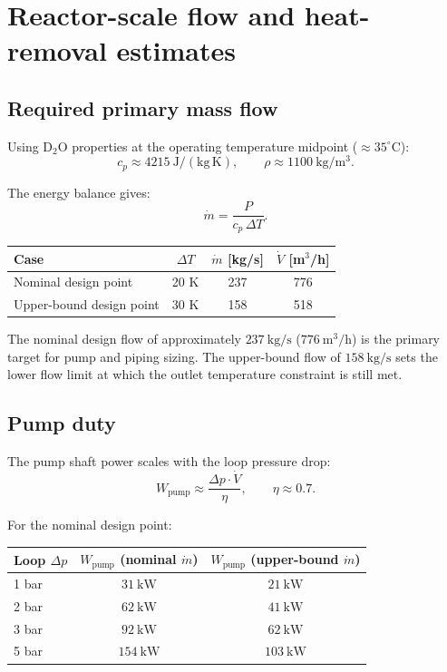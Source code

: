 \documentclass[11pt]{article}
\begin{document}
\section{Reactor-scale flow and heat-removal estimates}

\subsection{Required primary mass flow}

Using D$_2$O properties at the operating temperature midpoint
($\approx 35^{\circ}\mathrm{C}$):
\[
c_p \approx 4215\ \mathrm{J/(kg\,K)},
\qquad
\rho \approx 1100\ \mathrm{kg/m^3}.
\]

The energy balance gives:
\[
\dot{m} = \frac{P}{c_p\,\Delta T}.
\]

\begin{center}
\begin{tabular}{lccc}
\hline
Case & $\Delta T$ & $\dot{m}$ [kg/s] & $\dot{V}$ [m$^3$/h] \\
\hline
Nominal design point & 20 K & 237 & 776 \\
Upper-bound design point & 30 K & 158 & 518 \\
\hline
\end{tabular}
\end{center}

The nominal design flow of approximately $237\ \mathrm{kg/s}$
($776\ \mathrm{m^3/h}$) is the primary target for pump and piping sizing.
The upper-bound flow of $158\ \mathrm{kg/s}$ sets the lower flow limit
at which the outlet temperature constraint is still met.

\subsection{Pump duty}

The pump shaft power scales with the loop pressure drop:
\[
W_{\mathrm{pump}} \approx \frac{\Delta p \cdot \dot{V}}{\eta}, \qquad \eta \approx 0.7.
\]

For the nominal design point:

\begin{center}
\begin{tabular}{lcc}
\hline
Loop $\Delta p$ & $W_{\mathrm{pump}}$ (nominal $\dot{m}$) & $W_{\mathrm{pump}}$ (upper-bound $\dot{m}$) \\
\hline
1 bar & $31\ \mathrm{kW}$ & $21\ \mathrm{kW}$ \\
2 bar & $62\ \mathrm{kW}$ & $41\ \mathrm{kW}$ \\
3 bar & $92\ \mathrm{kW}$ & $62\ \mathrm{kW}$ \\
5 bar & $154\ \mathrm{kW}$ & $103\ \mathrm{kW}$ \\
\hline
\end{tabular}
\end{center}
\end{document}
